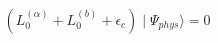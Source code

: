 \begin{equation}
(L_{0}^{(\alpha)}+L_{0}^{(b)}+\epsilon_{c})\mid\Psi_{phys}\rangle=0
\end{equation}

